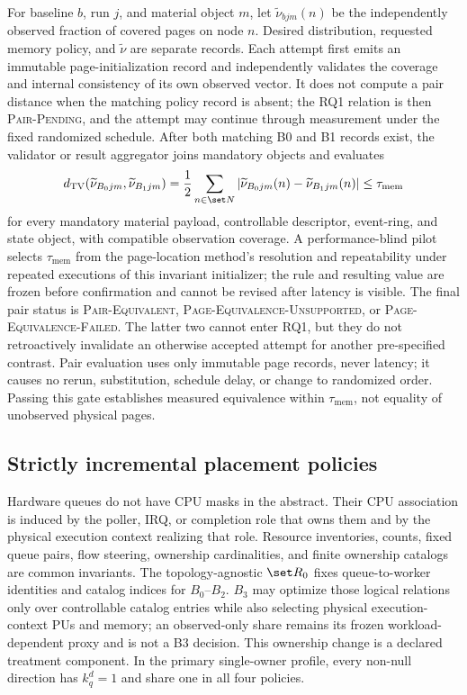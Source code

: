 For baseline $b$, run $j$, and material object $m$, let $\widetilde\nu_{bjm}(n)$ be the independently observed fraction of covered pages on node $n$. Desired distribution, requested memory policy, and $\widetilde\nu$ are separate records. Each attempt first emits an immutable page-initialization record and independently validates the coverage and internal consistency of its own observed vector. It does not compute a pair distance when the matching policy record is absent; the RQ1 relation is then \textsc{Pair-Pending}, and the attempt may continue through measurement under the fixed randomized schedule. After both matching B0 and B1 records exist, the validator or result aggregator joins mandatory objects and evaluates
\begin{equation}
 d_{\mathrm{TV}}(\widetilde\nu_{B_0jm},\widetilde\nu_{B_1jm})
 =\frac{1}{2}\sum_{n\in\set N}
 \left|\widetilde\nu_{B_0jm}(n)-\widetilde\nu_{B_1jm}(n)\right|
 \leq\tau_{\mathrm{mem}}
 \label{eq:page-equivalence}
\end{equation}
for every mandatory material payload, controllable descriptor, event-ring, and state object, with compatible observation coverage. A performance-blind pilot selects $\tau_{\mathrm{mem}}$ from the page-location method's resolution and repeatability under repeated executions of this invariant initializer; the rule and resulting value are frozen before confirmation and cannot be revised after latency is visible. The final pair status is \textsc{Pair-Equivalent}, \textsc{Page-Equivalence-Unsupported}, or \textsc{Page-Equivalence-Failed}. The latter two cannot enter RQ1, but they do not retroactively invalidate an otherwise accepted attempt for another pre-specified contrast. Pair evaluation uses only immutable page records, never latency; it causes no rerun, substitution, schedule delay, or change to randomized order. Passing this gate establishes measured equivalence within $\tau_{\mathrm{mem}}$, not equality of unobserved physical pages.

\subsection{Strictly incremental placement policies}

Hardware queues do not have CPU masks in the abstract. Their CPU association is induced by the poller, IRQ, or completion role that owns them and by the physical execution context realizing that role. Resource inventories, counts, fixed queue pairs, flow steering, ownership cardinalities, and finite ownership catalogs are common invariants. The topology-agnostic $\set R_0$ fixes queue-to-worker identities and catalog indices for $B_0$--$B_2$. $B_3$ may optimize those logical relations only over controllable catalog entries while also selecting physical execution-context PUs and memory; an observed-only share remains its frozen workload-dependent proxy and is not a B3 decision. This ownership change is a declared treatment component. In the primary single-owner profile, every non-null direction has $k_q^d=1$ and share one in all four policies.

